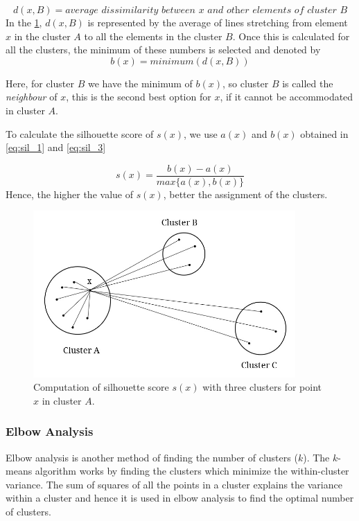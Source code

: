 \begin{equation}\label{eq:sil_2}
    d(x,B) = \textit{average dissimilarity between x and other elements of cluster B}  
\end{equation} %
In the \ref{fig:sil_score}, $d(x,B)$ is represented by the average of lines stretching from element $x$ in the  cluster $A$ to all the elements in the cluster $B$. Once this is calculated for all the clusters, the minimum of these numbers is selected and denoted by 
\begin{equation}\label{eq:sil_3}
    b(x) = minimum(d(x, B))
\end{equation}

Here, for cluster $B$ we have the minimum of $b(x)$, so cluster $B$ is called the \textit{neighbour} of $x$, this is the second best option for $x$, if it cannot be accommodated in cluster $A$.

To calculate the silhouette score of $s(x)$, we use $a(x)$ and $b(x)$ obtained in \ref{eq:sil_1} and \ref{eq:sil_3}

\begin{equation}
    s(x) = \frac{b(x)-a(x)}{max\{a(x),b(x)\}}
\end{equation}
Hence, the higher the value of $s(x)$, better the assignment of the clusters.

\begin{figure}[!ht]
    \centering
    \includegraphics[width= 10cm, keepaspectratio]{pics/sil_score.jpg}
    \captionsetup{justification=centering,margin=2cm}
    \caption{Computation of silhouette score $s(x)$ with three clusters for point $x$ in cluster $A$.}
    \label{fig:sil_score}
\end{figure}


\subsubsection{Elbow Analysis} \label{elbow}
Elbow analysis \cite{thorndike1953belongs,ketchen1996application} is another method of finding the number of clusters ($k$). The $k$-means algorithm works by finding the clusters which minimize the within-cluster variance. The sum of squares of all the points in a cluster explains the variance within a cluster and hence it is used in elbow analysis to find the optimal number of clusters. 

